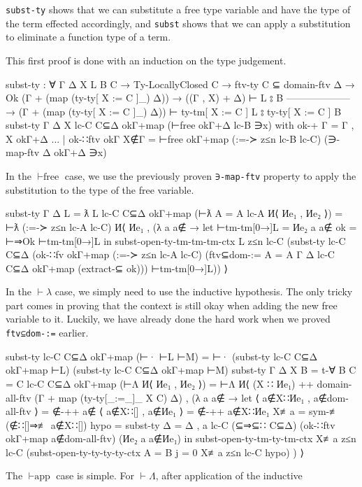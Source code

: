 \documentclass[logo,bsc,singlespacing,parskip,online]{infthesis}
\begin{document}
\texttt{subst-ty} shows that we can substitute a free type variable and have the type of the term
effected accordingly, and \texttt{subst} shows that we can apply a substitution to eliminate a
function type of a term.

This first proof is done with an induction on the type judgement.
\begin{code}
  subst-ty : ∀ {Γ Δ X L B C}
    → Ty-LocallyClosed C
    → ftv-ty C ⊆ domain-ftv Δ
    → Ok (Γ + (map (ty-ty[ X := C ]_) Δ))
    → ((Γ , X) + Δ) ⊢ L ⦂ B
      --------------------
    → (Γ + (map (ty-ty[ X := C ]_) Δ))
        ⊢ ty-tm[ X := C ] L ⦂ ty-ty[ X := C ] B
  subst-ty {Γ} {Δ} {X} lc-C C⊆Δ okΓ+map (⊢free okΓ+Δ lc-B ∋x)
    with ok-+ {Γ = Γ , X} okΓ+Δ
  ... | ok-∷ftv okΓ X∉Γ =
    ⊢free okΓ+map (:=-≻ z≤n lc-B lc-C) (∋-map-ftv Δ okΓ+Δ ∋x)
\end{code}
In the $\vdash\text{free}$ case, we use the previously proven \texttt{∋-map-ftv} property to apply
the substitution to the type of the free variable.
\begin{code}
  subst-ty {Γ} {Δ} {L = ƛ L} lc-C C⊆Δ okΓ+map (⊢ƛ {A = A} lc-A И⟨ Иe₁ , Иe₂ ⟩) =
    ⊢ƛ (:=-≻ z≤n lc-A lc-C) И⟨ Иe₁ , (λ a {a∉} →
      let ⊢tm-tm[0→]L = Иe₂ a {a∉}
          ok = ⊢⇒Ok ⊢tm-tm[0→]L
      in subst-open-ty-tm-tm-tm-ctx L z≤n lc-C
        (subst-ty lc-C C⊆Δ (ok-∷fv
            okΓ+map
            (:=-≻ z≤n lc-A lc-C)
            (ftv⊆dom-:= {A = A} Γ Δ lc-C C⊆Δ okΓ+map (extract-⊆ ok)))
          ⊢tm-tm[0→]L)) ⟩
\end{code}
In the $\vdash\lambda$ case, we simply need to use the inductive hypothesis. The only tricky part
comes in proving that the context is still okay when adding the new free variable to it. Luckily, we
have already done the hard work when we proved \texttt{ftv⊆dom-:=} earlier.
\begin{code}
  subst-ty lc-C C⊆Δ okΓ+map (⊢· ⊢L ⊢M) =
    ⊢· (subst-ty lc-C C⊆Δ okΓ+map ⊢L) (subst-ty lc-C C⊆Δ okΓ+map ⊢M)
  subst-ty {Γ} {Δ} {X} {B = t-∀ B} {C = C} lc-C C⊆Δ okΓ+map (⊢Λ И⟨ Иe₁ , Иe₂ ⟩) =
    ⊢Λ И⟨ (X ∷ Иe₁) ++ domain-all-ftv (Γ + map (ty-ty[_:=_]_ X C) Δ) , (λ a {a∉} →
      let ⟨ a∉X∷Иe₁ , a∉dom-all-ftv ⟩ = ∉-++ a∉
          ⟨ a∉X∷[] , a∉Иe₁ ⟩ = ∉-++ a∉X∷Иe₁
          X≢a = sym-≢ (∉∷[]⇒≢ a∉X∷[])
          hypo = subst-ty {Δ = Δ , a} lc-C (⊆⇒⊆∷ C⊆Δ)
              (ok-∷ftv okΓ+map a∉dom-all-ftv) (Иe₂ a {a∉Иe₁})
      in subst-open-ty-tm-ty-tm-ctx X≢a z≤n lc-C
        (subst-open-ty-ty-ty-ty-ctx {A = B} {j = 0} X≢a z≤n lc-C hypo) ) ⟩
\end{code}
The $\vdash\text{app}$ case is simple. For $\vdash\Lambda$, after application of the inductive
\end{document}
